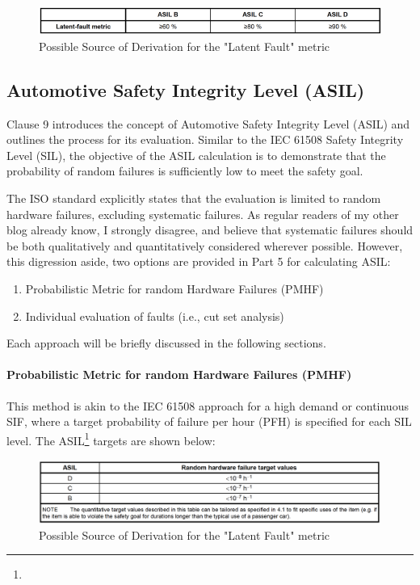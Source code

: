 \documentclass[./dissertation.tex]{subfiles}
\begin{document}
\begin{figure}[H]
\centering
\includegraphics[width=\linewidth]{subfiles/imgs/asil-t-5.png}
\caption{Possible Source of Derivation for the "Latent Fault" metric}
\label{fig:asil-t-5}
\end{figure}

\subsection{Automotive Safety Integrity Level (ASIL)}

Clause 9 introduces the concept of Automotive Safety Integrity Level (ASIL) and outlines the process for its evaluation. Similar to the IEC 61508 Safety Integrity Level (SIL), the objective of the ASIL calculation is to demonstrate that the probability of random failures is sufficiently low to meet the safety goal.

The ISO standard explicitly states that the evaluation is limited to random hardware failures, excluding systematic failures. As regular readers of my other blog already know, I strongly disagree, and believe that systematic failures should be both qualitatively and quantitatively considered wherever possible. However, this digression aside, two options are provided in Part 5 for calculating ASIL:

\begin{enumerate}
\item Probabilistic Metric for random Hardware Failures (PMHF)
\item Individual evaluation of faults (i.e., cut set analysis)
\end{enumerate}

Each approach will be briefly discussed in the following sections.

\paragraph{Probabilistic Metric for random Hardware Failures (PMHF)}

This method is akin to the IEC 61508 approach for a high demand or continuous SIF, where a target probability of failure per hour (PFH) is specified for each SIL level. The ASIL\footnote{} targets are shown below:

\begin{figure}[H]
\centering
\includegraphics[width=\linewidth]{subfiles/imgs/asil-t-6.png}
\caption{Possible Source of Derivation for the "Latent Fault" metric}
\label{fig:asil-t-6}
\end{figure}
\end{document}
